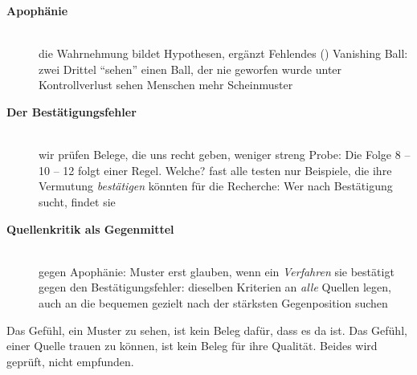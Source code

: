 \begin{description}
\item[{\rot\bf Apophänie}]~\\
\bi
  \ite die Wahrnehmung bildet Hypothesen, ergänzt Fehlendes
    ()
  \ite Vanishing Ball: zwei Drittel \enquote{sehen} einen Ball, der nie
    geworfen wurde \parencite{kuhn2016}
  \ite unter Kontrollverlust sehen Menschen mehr Scheinmuster
    \parencite{whitson2008lacking}
\ei
\os{\newpage}

\item[{\rot\bf Der Bestätigungsfehler}]~\\[-\lblskip]
\bi
  \ite wir prüfen Belege, die uns recht geben, weniger streng
    \parencite{nickerson1998ubiquitous}
  \ite Probe: Die Folge 8 -- 10 -- 12 folgt einer Regel. Welche?
  \ite fast alle testen nur Beispiele, die ihre Vermutung
    \emph{bestätigen} könnten \parencite{wason1960failure}
  \ite für die Recherche: Wer nach Bestätigung sucht, findet sie
\ei
{}
\os{\newpage}

\item[{\rot\bf Quellenkritik als Gegenmittel}]~\\[-\lblskip]
\bi
  \ite gegen Apophänie: Muster erst glauben, wenn ein \emph{Verfahren} sie
    bestätigt
  \ite gegen den Bestätigungsfehler: dieselben Kriterien an
    \emph{alle} Quellen legen, auch an die bequemen
  \ite gezielt nach der stärksten Gegenposition suchen
\ei
\os{\newpage}
\end{description}

\begin{merkbox}
Das Gefühl, ein Muster zu sehen, ist kein Beleg dafür, dass es da ist. Das
Gefühl, einer Quelle trauen zu können, ist kein Beleg für ihre Qualität.
Beides wird geprüft, nicht empfunden.
\end{merkbox}
\os{\newpage}

